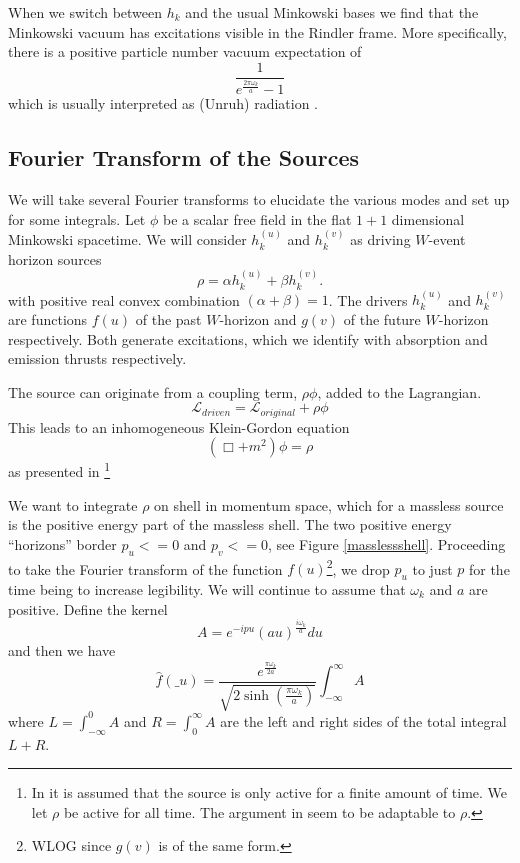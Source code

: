 \documentclass[12pt,a4paper]{article}
\begin{document}
When we switch between $h_k$ and the usual Minkowski bases we find that the Minkowski vacuum has excitations visible in the Rindler frame.  More specifically, there is a positive particle number vacuum expectation of
\begin{equation}
\label{radeq}
\frac{1}{e^{\frac{2 \pi \omega_k}{a}}-1}
\end{equation}
which is usually interpreted as (Unruh) radiation \cite{unruh}.

\subsection{Fourier Transform of the Sources}
We will take several Fourier transforms to elucidate the various modes and set up for some
integrals.  Let $\phi$ be a scalar free field in the flat $1+1$ dimensional Minkowski spacetime.  We will consider $h^{(u)}_k$ and $h^{(v )}_k$ as driving $W$-event horizon sources
\begin{equation}
\label{ab}
\rho = \alpha h^{(u)}_k + \beta h^{(v)}_k.
\end{equation}
with positive real convex combination $(\alpha + \beta) = 1$.
The drivers $h^{(u)}_k$ and $h^{(v)}_k$ are functions $f(u)$ of the past $W$-horizon and $g(v)$ of the future $W$-horizon respectively.  Both generate excitations, which we identify with absorption and emission thrusts respectively.


The source can originate from a coupling term, $\rho \phi$, added to the Lagrangian.
\begin{equation}
\mathscr{L}_{driven} = \mathscr{L}_{original} + \rho\phi 
\end{equation}
This leads to an inhomogeneous Klein-Gordon equation
\begin{equation}
(\Box + m^2) \phi = \rho
\end{equation}
as presented in \cite{beisert}\footnote{In \cite{beisert} it is assumed that the source is only active for a finite amount of time.  We let $\rho$ be active for all time.  The argument in \cite{beisert} seem to be adaptable to $\rho$.}

We want to integrate $\rho$ on shell in momentum space, which for a massless source is the positive energy part of the massless shell.  The two positive energy ``horizons'' border $p_u <= 0$ and $p_v <= 0$, see Figure \ref{masslessshell}.  Proceeding to take the Fourier transform of the function $f(u)$\footnote{WLOG since $g(v)$ is of the same form.}, we drop $p_u$ to just $p$ for the time being to increase legibility.  We will continue to assume that $\omega_k$ and $a$ are positive. Define the kernel
\begin{equation}
  A = e^{-i p u} (au)^\frac{i\omega_k}{a} du
\end{equation}
and then we have
\begin{equation}
\label{finalnorm}
  \hat{f}(\_u) =  \frac{e^{\frac{\pi \omega_k}{2a}}}{\sqrt{2 \sinh \left({\frac{\pi\omega_k}{a}}\right)}}  \int_{-\infty}^\infty A
\end{equation}
where $L=\int_{-\infty}^0 A$ and $R=\int_0^\infty A$ are the left and right sides of the total integral $L + R$.
\end{document}
